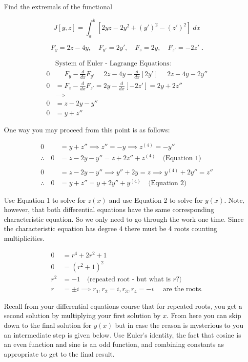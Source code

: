 \documentclass[a4paper]{article}
\begin{document}
Find the extremals of the functional

$$J[y,z] = \int_a^b \left[2yz -2y^2 + (y')^2 - (z')^2 \right] \; dx $$

$$F_y = 2z -4y, \quad F_{y'} = 2y', \quad F_z = 2y, \quad F_{z'} = -2z' \;. $$

\begin{align*}
&\text{System of Euler - Lagrange Equations:} \\
0 & = F_y - \frac{d}{dx}F_{y'} = 2z-4y - \frac{d}{dx}[2y'] = 2z - 4y - 2y'' \\
0 &= F_z - \frac{d}{dx}F_{z'} = 2y - \frac{d}{dx}[-2z']  = 2y + 2z''\\
&\implies \\
0 &= z- 2y - y'' \\
0&= y+z''
\end{align*}

One way you may proceed from this point is as follows:

\begin{align*}
0 &= y+z'' \implies z'' = -y \implies z^{(4)}= -y'' \\
\therefore \quad 0 &=z-2y-y'' = z+2z'' + z^{(4)} \quad \text{(Equation 1)}\\
& \\
0 &= z-2y - y'' \implies y''+2y = z \implies y^{(4)} + 2y'' = z'' \\
\therefore \quad 0 &= y+z'' = y+2y'' + y^{(4)} \quad \text{(Equation 2)}
\end{align*}

Use Equation 1 to solve for $z(x)$ and use Equation 2 to solve for $y(x)$. Note, however, that both differential equations have the same corresponding characteristic equation. So we only need to go through the work one time. Since the characteristic equation has degree 4 there must be 4 roots counting multiplicities.

\begin{align*}
0 &= r^4 + 2r^2 + 1 \\
0 &= (r^2+1)^2 \\
r^2 &= -1 \quad \text{(repeated root - but what is } r \text{?)} \\
r &= \pm i \implies r_1,r_2 = i, r_3,r_4 = -i \quad \text{ are the roots.}
\end{align*}

Recall from your differential equations course that for repeated roots, you get a second solution by multiplying your first solution by $x$. From here you can skip down to the final solution for $y(x)$ but in case the reason is mysterious to you  an  intermediate step is given below. Use Euler's identity, the fact that cosine is an even function and sine is an odd function, and combining constants as appropriate to get to the final result.  
\end{document}
